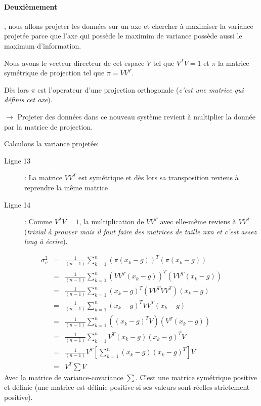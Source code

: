 \documentclass[a4paper, 11pt, onecolumn]{article}
\begin{document}
\begin{enumerate}
\paragraph{Deuxièmement}, nous allons projeter les données sur un axe et chercher à
maximiser la variance projetée parce que l'axe qui possède le maximim de variance possède aussi
le maximum d'information.
\begin{description}
  \item {Nous avons le vecteur directeur de cet espace $V$ tel que $V^T V=1$ et 
    $\pi$ la matrice symétrique de projection tel que $\pi = VV^T$.}
  \item {Dès lors $\pi$ est l'operateur d'une projection orthogonale 
      (\textit{c'est une matrice qui définis cet axe}).}
    \item {$\rightarrow$ Projeter des données dans ce nouveau système revient à multiplier la donnée par la matrice de projection. }
  \end{description} 
      Calculons la variance projetée:

\begin{framed}
  \begin{description}
    \item [Ligne 13] : La matrice $VV^T$ est symétrique et dès lors sa transposition reviens à reprendre la même matrice 
    \item [Ligne 14] : Comme $V^TV = 1$, la multiplication de $VV^T$ avec elle-même reviens à $VV^T$ (\textit{trivial à prouver mais il faut faire des matrices de taille nxn et c'est assez long à écrire}).
  \end{description}

\begin{eqnarray}
\sigma^2_v &=& \frac{1}{(n-1)}  \sum_{k=1}^n (\pi(x_k-g))^T(\pi(x_k-g))\\
&=& \frac{1}{(n-1)}  \sum_{k=1}^n (VV^T(x_k-g))^T(VV^T(x_k-g))\\
&=& \frac{1}{(n-1)}  \sum_{k=1}^n (x_k-g)^T(VV^TVV^T)(x_k-g)\\
&=& \frac{1}{(n-1)}  \sum_{k=1}^n (x_k-g)^TVV^T(x_k-g)\\
&=& \frac{1}{(n-1)}  \sum_{k=1}^n ((x_k-g)^TV)(V^T(x_k-g))\\
&=& \frac{1}{(n-1)}  \sum_{k=1}^n V^T(x_k-g)(x_k-g)^TV\\
&=& \frac{1}{(n-1)}  V^T\left[\sum_{k=1}^n (x_k-g)(x_k-g)^T\right]V\\
&=& V^T\sum V
\end{eqnarray}
Avec la matrice de variance-covariance $\sum$. C'est une matrice symétrique positive et définie (une matrice est définie positive si ses valeurs sont réelles strictement positive).
\end{framed}


\end{enumerate}
\end{document}
